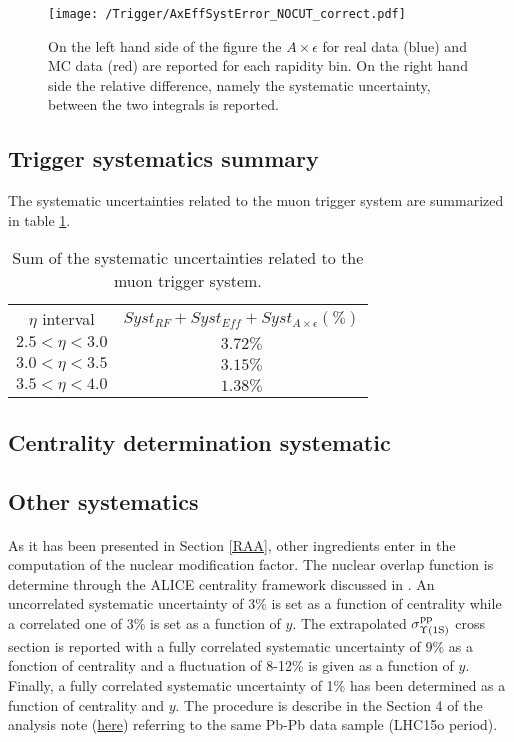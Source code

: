 \begin{figure}[!h]
\begin{center}
  \texttt{[image: /Trigger/AxEffSystError\_NOCUT\_correct.pdf]}
\end{center} 
\caption{\label{fig:AxEffSyst} On the left hand side of the figure the $A\times\epsilon$ for real data (blue) and MC data (red) are reported for each rapidity bin. On the right hand side the relative difference, namely the systematic uncertainty, between the two integrals is reported.}
\end{figure}

\subsection{Trigger systematics summary}
The systematic uncertainties related to the muon trigger system are summarized in table \ref{tab:systSum}.

\begin{table}[!htb]
\centering
\begin{tabular}{ |c|c| }
 \hline
 $\eta$ interval&  $Syst_{RF}+Syst_{Eff}+Syst_{A\times\epsilon} (\%)$  \\
 \hhline{|=|=|}
 $2.5<\eta<3.0$&  $3.72\%$  \\
 \hline
 $3.0<\eta<3.5$&  $3.15\%$  \\
 \hline
 $3.5<\eta<4.0$&  $1.38\%$  \\
 \hline
\end{tabular}
\caption{Sum of the systematic uncertainties related to the muon trigger system.}
\label{tab:systSum}
\end{table}

\subsection{Centrality determination systematic}

\subsection{Other systematics}

\paragraph{}
As it has been presented in Section \ref{RAA}, other ingredients enter in the computation of the \ups nuclear modification factor.
The nuclear overlap function is determine through the ALICE centrality framework discussed in \cite{centframework}.
An uncorrelated systematic uncertainty of 3\% is set as a function of centrality while a correlated one of 3\% is set as a function of $y$.
The extrapolated $\sigma^{\rm pp}_{\Upsilon\mathrm{(1S)}}$ cross section is reported with a fully correlated systematic uncertainty of 9\% as a fonction of centrality and a fluctuation of 8-12\% is given as a function of $y$. 
Finally, a fully correlated systematic uncertainty of 1\% has been determined as a function of centrality and $y$.
The procedure is describe in the Section 4 of the \jpsi analysis note (\href{https://aliceinfo.cern.ch/Notes/node/486}{here}) referring to the same Pb-Pb data sample (LHC15o period).


